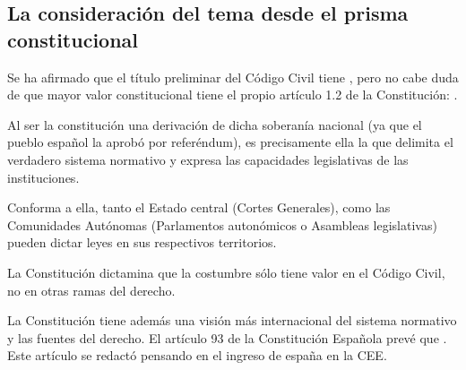 \documentclass[a4paper,12pt]{report}
\begin{document}
\subsection{La consideración del tema desde el prisma constitucional}

Se ha afirmado que el título preliminar del Código Civil tiene , pero no cabe duda de que mayor valor constitucional tiene el propio artículo 1.2 de la Constitución: .

Al ser la constitución una derivación de dicha soberanía nacional (ya que el pueblo español la aprobó por referéndum), es precisamente ella la que delimita el verdadero sistema normativo y expresa las capacidades legislativas de las instituciones.

Conforma a ella, tanto el Estado central (Cortes Generales), como las Comunidades Autónomas (Parlamentos autonómicos o Asambleas legislativas) pueden dictar leyes en sus respectivos territorios.

La Constitución dictamina que la costumbre sólo tiene valor en el Código Civil, no en otras ramas del derecho.

La Constitución tiene además una visión más internacional del sistema normativo y las fuentes del derecho. El artículo 93 de la Constitución Española prevé que . Este artículo se redactó pensando en el ingreso de españa en la CEE.
\end{document}
